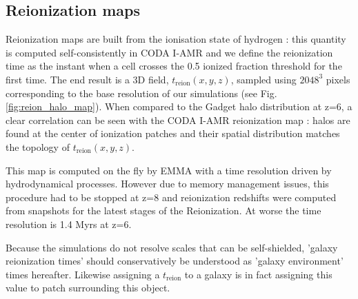 \documentclass[twocolumn]{aastex61}
\newcommand{\dom}[1]{{#1}}
\begin{document}


\subsection{Reionization maps}
Reionization maps are built from the ionisation state of  hydrogen : this quantity is computed self-consistently in CODA I-AMR and we define the reionization time as the  instant when a cell crosses  the 0.5 ionized fraction threshold for the first time.  The end result is a 3D field, $t_\mathrm{reion}(x,y,z)$, sampled using $2048^3$ pixels corresponding to the base resolution of our simulations (see Fig. \ref{fig:reion_halo_map}). When compared to the Gadget halo distribution at z=6,  a clear correlation can be seen with the CODA I-AMR reionization map : \dom{halos are found at the center of ionization patches and their spatial distribution matches the topology of $t_\mathrm{reion}(x,y,z)$}.

This map is computed on the fly by EMMA with a time resolution driven by hydrodynamical processes. However due  to memory management issues, this procedure had to be stopped at z=8 and reionization redshifts were computed from snapshots for the latest stages of the Reionization. At worse the time resolution is 1.4 Myrs at z=6.

Because the simulations do not resolve scales that can be self-shielded,  'galaxy reionization times' should conservatively be understood as 'galaxy environment' times hereafter. Likewise assigning a $t_\mathrm{reion}$ to a galaxy is in fact assigning this value to patch surrounding this object.


\end{document}
